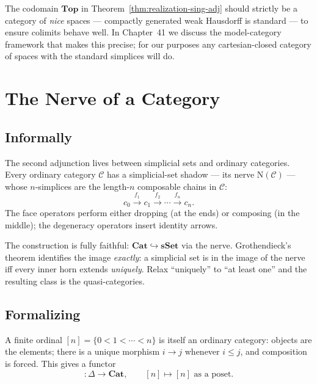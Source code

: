 \begin{remark}
The codomain $\mathbf{Top}$ in Theorem~\ref{thm:realization-sing-adj}
should strictly be a category of \emph{nice} spaces — compactly generated
weak Hausdorff is standard — to ensure colimits behave well. In
Chapter~41 we discuss the model-category framework that makes this
precise; for our purposes any cartesian-closed category of spaces with
the standard simplices will do.
\end{remark}


\section{The Nerve of a Category}
\label{sec:nerve}

\subsection{Informally}

The second adjunction lives between simplicial sets and ordinary
categories. Every ordinary category $\mathcal{C}$ has a simplicial-set
shadow — its nerve $\mathrm{N}(\mathcal{C})$ — whose $n$-simplices are
the length-$n$ composable chains in $\mathcal{C}$:
\begin{equation*}
  c_0 \xrightarrow{f_1} c_1 \xrightarrow{f_2} \cdots \xrightarrow{f_n} c_n.
\end{equation*}
The face operators perform either dropping (at the ends) or composing
(in the middle); the degeneracy operators insert identity arrows.

The construction is fully faithful: $\mathbf{Cat} \hookrightarrow
\mathbf{sSet}$ via the nerve. Grothendieck's theorem identifies the
image \emph{exactly}: a simplicial set is in the image of the nerve iff
every inner horn extends \emph{uniquely}. Relax ``uniquely'' to ``at
least one'' and the resulting class is the quasi-categories.

\subsection{Formalizing}

A finite ordinal $[n] = \{0 < 1 < \cdots < n\}$ is itself an ordinary
category: objects are the elements; there is a unique morphism $i \to j$
whenever $i \leq j$, and composition is forced. This gives a functor
\begin{equation*}
  [-]: \Delta \longrightarrow \mathbf{Cat}, \qquad [n] \longmapsto [n] \text{ as a poset}.
\end{equation*}


